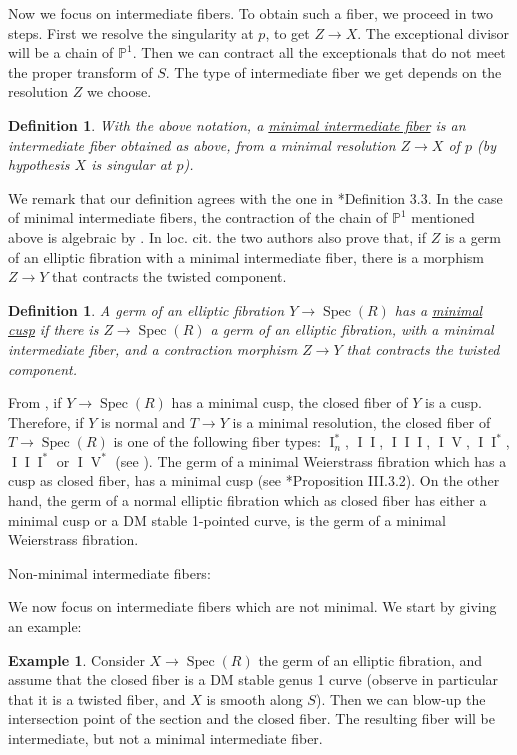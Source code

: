 \documentclass[11pt]{amsart}
\newcommand{\spec}{\operatorname{Spec}}
\newcommand{\I}{\operatorname{I}}
\newtheorem{Def}[theorem]{Definition}
\theoremstyle{definition}
\newtheorem{EG}[theorem]{Example}
\begin{document}
Now we focus on intermediate fibers. To obtain such a fiber, we proceed in two steps. First we resolve the singularity at $p$, to get $Z \to X$.
The exceptional divisor will be a chain
of $\mathbb{P}^1$. Then we can contract all the exceptionals that do not meet the proper transform of $S$. The type of intermediate fiber we get
depends on the resolution $Z$ we choose.
\begin{Def}\label{Def:minimal:intermediate}
 With the above notation, a \underline{minimal intermediate fiber} is an intermediate fiber obtained as above, from a minimal resolution $Z \to X$
 of $p$ (by hypothesis $X$ is singular at $p$). 
\end{Def}
We remark that our definition agrees with the one in \cite{AB3}*{Definition 3.3}.
In the case of minimal intermediate fibers, the contraction of the chain of $\mathbb{P}^1$ mentioned above is algebraic by \cite{AB1}. 
In loc. cit. the two authors also prove that,
if $Z$ is a germ of an elliptic fibration with a minimal intermediate fiber, there is a morphism $Z \to Y$ that contracts the twisted component.
\begin{Def}
 A germ of an elliptic fibration $Y \to \spec(R)$ has a \underline{minimal cusp} if there is $Z \to \spec(R)$ a germ of an elliptic
 fibration, with a minimal intermediate fiber, and a contraction morphism $Z \to Y$ that contracts the twisted component. 
\end{Def} From \cite{AB1}, if $Y \to \spec(R)$ has a minimal cusp, the closed fiber of $Y$ is a cusp.
Therefore, if $Y$ is normal and $T \to Y$ is a minimal resolution, the closed fiber of $T \to \spec(R)$ is one of the
following fiber types: $\operatorname{I}_n^*$, $\I \I$, $\I\I\I$, $\I\operatorname{V}$, $\I\I^*$, $\I\I\I^*$ or
 $\I\operatorname{V}^*$ (see \cite{Miranda}). The germ of a minimal Weierstrass fibration which has a cusp as closed fiber, has a minimal cusp (see \cite{Miranda}*{Proposition III.3.2}). On the other hand, the germ of a normal elliptic fibration which as closed fiber has either a minimal cusp or a DM stable 1-pointed curve, is the germ of a minimal Weierstrass fibration.
  
\begin{bf}Non-minimal intermediate fibers:\end{bf} We now focus on intermediate fibers which are not minimal.
We start by giving an example:
\theoremstyle{definition}
\begin{EG}\label{Example:smooth:int:fiber}
Consider $X \to \spec(R)$ the germ of an elliptic fibration, and assume that
the closed fiber is a DM stable genus 1 curve (observe in particular that it is a twisted fiber, and $X$ is smooth along $S$).
Then we can blow-up the intersection point of the section and the closed fiber. The resulting fiber will
be intermediate, but not a minimal intermediate fiber.\end{EG}
\end{document}
